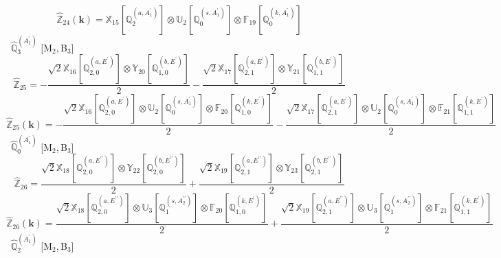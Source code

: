 \documentclass[fleqn,10pt,landscape]{article}
\begin{document}
\begin{itemize}
\begin{dmath*}
\end{dmath*}
\begin{dmath*}
\hat{\mathbb{Z}}_{24}(\bm{k})=\mathbb{X}_{15}[\mathbb{Q}_{2}^{(a,A_{1}^{\prime})}] \otimes\mathbb{U}_{2}[\mathbb{Q}_{0}^{(s,A_{1}^{\prime})}] \otimes\mathbb{F}_{19}[\mathbb{Q}_{0}^{(k,A_{1}^{\prime})}]
\end{dmath*}
\vspace{4mm}
\noindent {} $\,\,\,\hat{\mathbb{Q}}_{3}^{(A_{1}^{\prime})}$ [M$_{2}$,\,B$_{3}$]
\begin{dmath*}
\hat{\mathbb{Z}}_{25}=- \frac{\sqrt{2} \mathbb{X}_{16}[\mathbb{Q}_{2,0}^{(a,E^{\prime})}] \otimes\mathbb{Y}_{20}[\mathbb{Q}_{1,0}^{(b,E^{\prime})}]}{2} - \frac{\sqrt{2} \mathbb{X}_{17}[\mathbb{Q}_{2,1}^{(a,E^{\prime})}] \otimes\mathbb{Y}_{21}[\mathbb{Q}_{1,1}^{(b,E^{\prime})}]}{2}
\end{dmath*}
\begin{dmath*}
\hat{\mathbb{Z}}_{25}(\bm{k})=- \frac{\sqrt{2} \mathbb{X}_{16}[\mathbb{Q}_{2,0}^{(a,E^{\prime})}] \otimes\mathbb{U}_{2}[\mathbb{Q}_{0}^{(s,A_{1}^{\prime})}] \otimes\mathbb{F}_{20}[\mathbb{Q}_{1,0}^{(k,E^{\prime})}]}{2} - \frac{\sqrt{2} \mathbb{X}_{17}[\mathbb{Q}_{2,1}^{(a,E^{\prime})}] \otimes\mathbb{U}_{2}[\mathbb{Q}_{0}^{(s,A_{1}^{\prime})}] \otimes\mathbb{F}_{21}[\mathbb{Q}_{1,1}^{(k,E^{\prime})}]}{2}
\end{dmath*}
\vspace{4mm}
\noindent {} $\,\,\,\hat{\mathbb{Q}}_{0}^{(A_{1}^{\prime})}$ [M$_{2}$,\,B$_{3}$]
\begin{dmath*}
\hat{\mathbb{Z}}_{26}=\frac{\sqrt{2} \mathbb{X}_{18}[\mathbb{Q}_{2,0}^{(a,E^{\prime\prime})}] \otimes\mathbb{Y}_{22}[\mathbb{Q}_{2,0}^{(b,E^{\prime\prime})}]}{2} + \frac{\sqrt{2} \mathbb{X}_{19}[\mathbb{Q}_{2,1}^{(a,E^{\prime\prime})}] \otimes\mathbb{Y}_{23}[\mathbb{Q}_{2,1}^{(b,E^{\prime\prime})}]}{2}
\end{dmath*}
\begin{dmath*}
\hat{\mathbb{Z}}_{26}(\bm{k})=\frac{\sqrt{2} \mathbb{X}_{18}[\mathbb{Q}_{2,0}^{(a,E^{\prime\prime})}] \otimes\mathbb{U}_{3}[\mathbb{Q}_{1}^{(s,A_{2}^{\prime\prime})}] \otimes\mathbb{F}_{20}[\mathbb{Q}_{1,0}^{(k,E^{\prime})}]}{2} + \frac{\sqrt{2} \mathbb{X}_{19}[\mathbb{Q}_{2,1}^{(a,E^{\prime\prime})}] \otimes\mathbb{U}_{3}[\mathbb{Q}_{1}^{(s,A_{2}^{\prime\prime})}] \otimes\mathbb{F}_{21}[\mathbb{Q}_{1,1}^{(k,E^{\prime})}]}{2}
\end{dmath*}
\vspace{4mm}
\noindent {} $\,\,\,\hat{\mathbb{Q}}_{2}^{(A_{1}^{\prime})}$ [M$_{2}$,\,B$_{3}$]

\end{itemize}
\end{document}

